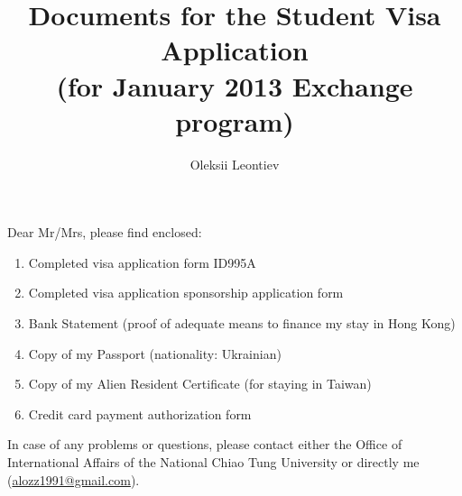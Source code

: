\documentclass[11pt]{article}
\title{Documents for the Student Visa Application\\
(for January 2013 Exchange program)}
\author{Oleksii Leontiev}
\begin{document}
\maketitle
Dear Mr/Mrs, please find enclosed:
\begin{enumerate}
\item{Completed visa application form ID995A}%
\item{Completed visa application sponsorship application form}
\item{Bank Statement (proof of adequate means to finance my stay in Hong Kong)}%
\item{Copy of my Passport (nationality: Ukrainian)}
\item{Copy of my Alien Resident Certificate (for staying in Taiwan)}%
\item{Credit card payment authorization form}%
\end{enumerate}
In case of any problems or questions, please contact either the Office of International Affairs of the National Chiao Tung University or directly me (\href{mailto:alozz1991@gmail.com}{alozz1991@gmail.com}).
\end{document}
